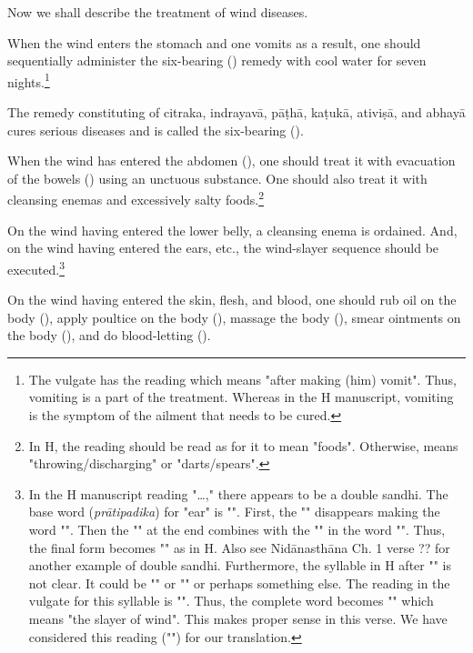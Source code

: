 \begin{translation}
    
    \item [1] 
    Now we shall describe the treatment of wind diseases.
    
    \item [2]

    \item [3]
    When the wind enters the stomach and one vomits as a result, one should sequentially administer the six-bearing () remedy with cool water for seven nights.\footnote{The vulgate has the reading  which means "after making (him) vomit". Thus, vomiting is a part of the treatment. Whereas in the H manuscript, vomiting is the symptom of the ailment that needs to be cured.}

    \item [4]
    The remedy constituting of \gls{citraka}, \gls{indrayavā}, \gls{pāṭhā}, \gls{kaṭukā}, \gls{ativiṣā}, and \gls{abhayā} cures serious diseases and is called the six-bearing ().

    \item [5]
    When the wind has entered the abdomen (), one should treat it with evacuation of the bowels () using an unctuous substance. One should also treat it with cleansing enemas and excessively salty foods.\footnote{In H, the reading  should be read as  for it to mean "foods". Otherwise,  means "throwing/discharging" or "darts/spears".} 

    \item [6]
    On the wind having entered the lower belly, a cleansing enema is ordained. And, on the wind having entered the ears, etc., the wind-slayer sequence should be executed.\footnote{In the H manuscript reading "\ldots," there appears to be a double sandhi. The base word (\emph{prātipadika}) for "ear" is "". First, the "" disappears making the word "". Then the "" at the end combines with the "" in the word "". Thus, the final form becomes "" as in H. Also see Nidānasthāna Ch. 1 verse ?? for another example of double sandhi.
    Furthermore, the syllable in H after "" is not clear. It could be "" or "" or perhaps something else. The reading in the vulgate for this syllable is "". Thus, the complete word becomes "" which means "the slayer of wind". This makes proper sense in this verse. We have considered this reading ("") for our translation.}    

    \item [7]
    On the wind having entered the skin, flesh, and blood, one should rub oil on the body (), apply poultice on the body (), massage the body (), smear ointments on the body (), and do blood-letting (). 

    
\end{translation}
